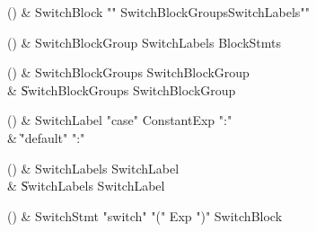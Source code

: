 \begin{bbgrammarappendix}{3.9in}

() & SwitchBlock \label{prod:SwitchBlock}  \: \xcd"{" SwitchBlockGroups\opt SwitchLabels\opt \xcd"}"  \\


\end{bbgrammarappendix}

\begin{bbgrammarappendix}{3.4in}

() & SwitchBlockGroup \label{prod:SwitchBlockGroup}  \: SwitchLabels BlockStmts  \\


\end{bbgrammarappendix}

\begin{bbgrammarappendix}{3.3in}

() & SwitchBlockGroups \label{prod:SwitchBlockGroups}  \: SwitchBlockGroup  \\

 &    \| SwitchBlockGroups SwitchBlockGroup \\

\end{bbgrammarappendix}

\begin{bbgrammarappendix}{3.9in}

() & SwitchLabel \label{prod:SwitchLabel}  \: \xcd"case" ConstantExp \xcd":"  \\

 &    \| \xcd"default" \xcd":" \\

\end{bbgrammarappendix}

\begin{bbgrammarappendix}{3.8in}

() & SwitchLabels \label{prod:SwitchLabels}  \: SwitchLabel  \\

 &    \| SwitchLabels SwitchLabel \\

\end{bbgrammarappendix}

\begin{bbgrammarappendix}{4.0in}

() & SwitchStmt \label{prod:SwitchStmt}  \: \xcd"switch" \xcd"(" Exp \xcd")" SwitchBlock  \\


\end{bbgrammarappendix}

